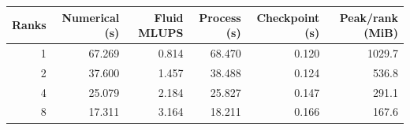 \begin{center}\small
\begin{tabular}{rrrrrr}
\toprule
Ranks & Numerical (s) & Fluid MLUPS & Process (s) & Checkpoint (s) & Peak/rank (MiB)\\
\midrule
1 & 67.269 & 0.814 & 68.470 & 0.120 & 1029.7\\
2 & 37.600 & 1.457 & 38.488 & 0.124 & 536.8\\
4 & 25.079 & 2.184 & 25.827 & 0.147 & 291.1\\
8 & 17.311 & 3.164 & 18.211 & 0.166 & 167.6\\
\bottomrule
\end{tabular}
\end{center}
